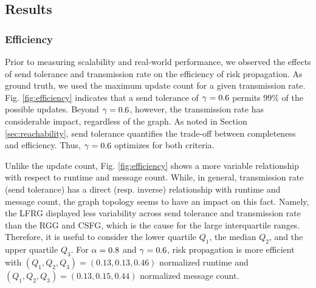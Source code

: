 \subsection{Results}

\subsubsection{Efficiency}

Prior to measuring scalability and real-world performance, we observed the effects of send tolerance and transmission rate on the efficiency of risk propagation. As ground truth, we used the maximum update count for a given transmission rate. Fig. \ref{fig:efficiency} indicates that a send tolerance of $\gamma = 0.6$ permits 99\% of the possible updates. Beyond $\gamma = 0.6$, however, the transmission rate has considerable impact, regardless of the graph. As noted in Section \ref{sec:reachability}, send tolerance quantifies the trade-off between completeness and efficiency. Thus, $\gamma = 0.6$ optimizes for both criteria.

Unlike the update count, Fig. \ref{fig:efficiency} shows a more variable relationship with respect to runtime and message count. While, in general, transmission rate (send tolerance) has a direct (resp. inverse) relationship with runtime and message count, the graph topology seems to have an impact on this fact. Namely, the LFRG displayed less variability across send tolerance and transmission rate than the RGG and CSFG, which is the cause for the large interquartile ranges. Therefore, it is useful to consider the lower quartile $Q_1$, the median $Q_2$, and the upper quartile $Q_3$. For $\alpha = 0.8 $ and $\gamma = 0.6$, risk propagation is more efficient with $(Q_{1}, Q_{2}, Q_{3}) = (0.13, 0.13, 0.46)$ normalized runtime and $(Q_{1}, Q_{2}, Q_{3}) = (0.13, 0.15, 0.44)$ normalized message count.

